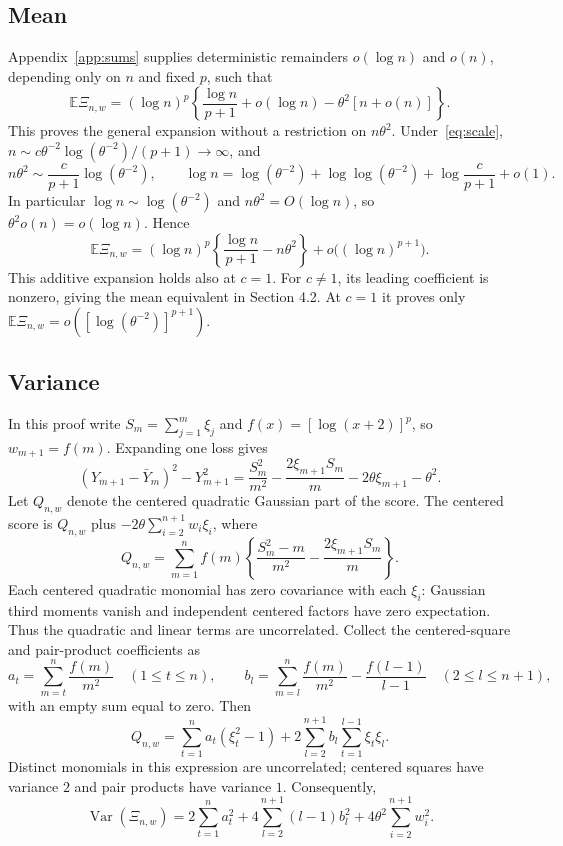 \documentclass[11pt]{article}
\theoremstyle{definition}
\begin{document}
\subsection{Mean}\label{app:mean}
Appendix~\ref{app:sums} supplies deterministic remainders
$o(\log n)$ and $o(n)$, depending only on $n$ and fixed $p$, such that
\[
\mathbb E\Xi_{n,w}
=(\log n)^p\left\{\frac{\log n}{p+1}+o(\log n)
-\theta^2[n+o(n)]\right\}.
\]
This proves the general expansion without a restriction on $n\theta^2$.
Under~\eqref{eq:scale}, $n\sim
c\theta^{-2}\log(\theta^{-2})/(p+1)\to\infty$, and
\[
n\theta^2\sim\frac{c}{p+1}\log(\theta^{-2}),\qquad
\log n=\log(\theta^{-2})+\log\log(\theta^{-2})
+\log\frac{c}{p+1}+o(1).
\]
In particular $\log n\sim\log(\theta^{-2})$ and
$n\theta^2=O(\log n)$, so $\theta^2o(n)=o(\log n)$. Hence
\[
\mathbb E\Xi_{n,w}
=(\log n)^p\left\{\frac{\log n}{p+1}-n\theta^2\right\}
+o\bigl((\log n)^{p+1}\bigr).
\]
This additive expansion holds also at $c=1$. For
$c\ne1$, its leading coefficient is nonzero, giving the
mean equivalent in Section 4.2. At $c=1$ it proves only
$\mathbb E\Xi_{n,w}=o([\log(\theta^{-2})]^{p+1})$.

\subsection{Variance}\label{app:variance}
In this proof write $S_m=\sum_{j=1}^m\xi_j$ and
$f(x)=[\log(x+2)]^p$, so $w_{m+1}=f(m)$. Expanding one loss gives
\[
(Y_{m+1}-\bar Y_m)^2-Y_{m+1}^2
=\frac{S_m^2}{m^2}-\frac{2\xi_{m+1}S_m}{m}
-2\theta\xi_{m+1}-\theta^2.
\]
Let $Q_{n,w}$ denote the centered quadratic Gaussian part of the score.
The centered score is $Q_{n,w}$ plus
$-2\theta\sum_{i=2}^{n+1}w_i\xi_i$, where
\[
Q_{n,w}=\sum_{m=1}^nf(m)
\left\{\frac{S_m^2-m}{m^2}-\frac{2\xi_{m+1}S_m}{m}\right\}.
\]
Each centered quadratic monomial has zero covariance with each
$\xi_i$: Gaussian third moments vanish and independent centered
factors have zero expectation. Thus the quadratic and linear terms
are uncorrelated. Collect the centered-square and pair-product
coefficients as
\[
a_t=\sum_{m=t}^n\frac{f(m)}{m^2}\quad(1\le t\le n),\qquad
b_l=\sum_{m=l}^n\frac{f(m)}{m^2}-\frac{f(l-1)}{l-1}
\quad(2\le l\le n+1),
\]
with an empty sum equal to zero. Then
\[
Q_{n,w}=\sum_{t=1}^na_t(\xi_t^2-1)
+2\sum_{l=2}^{n+1}b_l\sum_{t=1}^{l-1}\xi_t\xi_l.
\]
Distinct monomials in this expression are uncorrelated; centered
squares have variance $2$ and pair products have variance $1$.
Consequently,
\begin{equation}\label{eq:exactvar}
\operatorname{Var}(\Xi_{n,w})
=2\sum_{t=1}^na_t^2+4\sum_{l=2}^{n+1}(l-1)b_l^2
+4\theta^2\sum_{i=2}^{n+1}w_i^2.
\end{equation}
\end{document}
